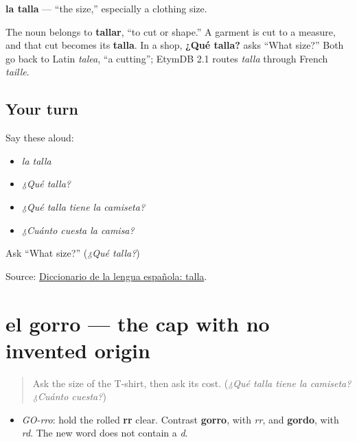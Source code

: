 \begin{cousinweb}
\textbf{la talla} — \textquotedblleft{}the size,\textquotedblright{} especially a clothing size.

The noun belongs to \textbf{tallar}, \textquotedblleft{}to cut or shape.\textquotedblright{} A garment is cut to a measure, and that cut becomes its \textbf{talla}. In a shop, \textbf{¿Qué talla?} asks \textquotedblleft{}What size?\textquotedblright{} Both go back to Latin \emph{talea}, \textquotedblleft{}a cutting\textquotedblright{}; EtymDB 2.1 routes \emph{talla} through French \emph{taille}.
\end{cousinweb}

\subsection*{Your turn}
Say these aloud:

\begin{itemize}
\raggedright
  \item \emph{la talla}
  \item \emph{¿Qué talla?}
  \item \emph{¿Qué talla tiene la camiseta?}
  \item \emph{¿Cuánto cuesta la camisa?}
\end{itemize}

\begin{tcolorbox}[breakable,colback=teal!4,colframe=teal!35!black,title={Before you move on}]
Ask \textquotedblleft{}What size?\textquotedblright{} (\emph{¿Qué talla?})

Source: \href{https://dle.rae.es/talla}{Diccionario de la lengua española: talla}.
\end{tcolorbox}
\section[el gorro]{el gorro — the cap with no invented origin}

\label{lesson:ES-C402-gorro}



\begin{quote}
Ask the size of the T-shirt, then ask its cost. (\emph{¿Qué talla tiene la camiseta? ¿Cuánto cuesta?})
\end{quote}

\begin{sounds}
\begin{itemize}
\raggedright
  \item \emph{GO-rro}: hold the rolled \textbf{rr} clear. Contrast \textbf{gorro}, with \emph{rr}, and \textbf{gordo}, with \emph{rd}. The new word does not contain a \emph{d}.
\end{itemize}
\end{sounds}

